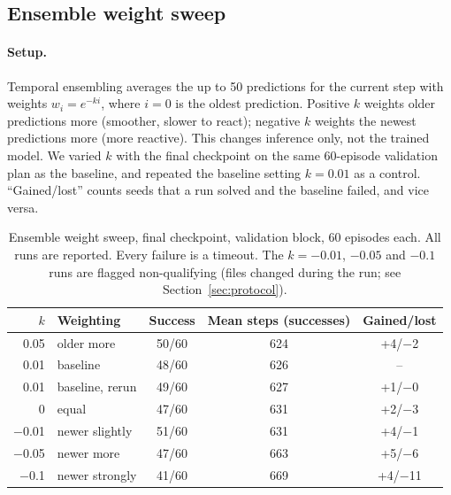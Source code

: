 \documentclass[11pt,a4paper]{article}
\begin{document}
\subsection{Ensemble weight sweep}
\label{sec:ksweep}

\paragraph{Setup.} Temporal ensembling averages the up to 50 predictions
for the current step with weights $w_i=e^{-k i}$, where $i=0$ is the
oldest prediction. Positive $k$ weights older predictions more (smoother,
slower to react); negative $k$ weights the newest predictions more (more
reactive). This changes inference only, not the trained model. We varied
$k$ with the final checkpoint on the same 60-episode validation plan as the
baseline, and repeated the baseline
setting $k=0.01$ as a control. ``Gained/lost'' counts seeds that a run
solved and the baseline failed, and vice versa.

\begin{table}[h]
\centering
\begin{tabular}{rlccc}
\toprule
$k$ & Weighting & Success & Mean steps (successes) & Gained/lost \\
\midrule
0.05 & older more & 50/60 & 624 & +4/$-$2 \\
0.01 & baseline & 48/60 & 626 & -- \\
0.01 & baseline, rerun & 49/60 & 627 & +1/$-$0 \\
0 & equal & 47/60 & 631 & +2/$-$3 \\
$-$0.01 & newer slightly & 51/60 & 631 & +4/$-$1 \\
$-$0.05 & newer more & 47/60 & 663 & +5/$-$6 \\
$-$0.1 & newer strongly & 41/60 & 669 & +4/$-$11 \\
\bottomrule
\end{tabular}
\caption{Ensemble weight sweep, final checkpoint, validation block,
60 episodes each. All runs are reported. Every failure is a timeout. The
$k=-0.01$, $-0.05$ and $-0.1$ runs are flagged non-qualifying (files changed
during the run; see Section~\ref{sec:protocol}).}
\label{tab:ksweep}
\end{table}
\end{document}

